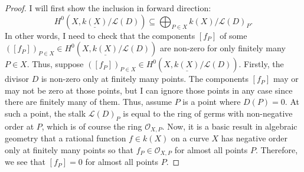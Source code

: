 \begin{proof}
  I will first show the inclusion in forward direction:
  \[
    H^{0}(X,\underline{k(X)}/\mathcal{L}(D))\subseteq\bigoplus_{P\in X}
    k(X)/\mathcal{L}(D)_{P}.
  \]
  In other words, I need to check that the components $[f_{P}]$ of some
  $([f_{P}])_{P\in X}\in H^{0}(X,\underline{k(X)}/\mathcal{L}(D))$ are non-zero
  for only finitely many $P\in X$. Thus, suppose $([f_{P}])_{P\in X}\in
  H^{0}(X,\underline{k(X)}/\mathcal{L}(D))$. Firstly, the divisor $D$ is
  non-zero only at finitely many points. The components $[f_{P}]$ may or may
  not be zero at those points, but I can ignore those points in any case
  since there are finitely many of them. Thus, assume $P$ is a point where
  $D(P)=0$. At such a point, the stalk $\mathcal{L}(D)_{P}$ is equal to the
  ring of germs with non-negative order at $P$, which is of course the ring
  $\mathscr{O}_{X,P}$. Now, it is a basic result in algebraic geometry that
  a rational function $f\in k(X)$ on a curve $X$ has negative order only
  at finitely many points so that $f_{P}\in\mathscr{O}_{X,P}$ for almost
  all points $P$. Therefore, we see that $[f_{P}]=0$ for almost all points
  $P$.


\end{proof}
